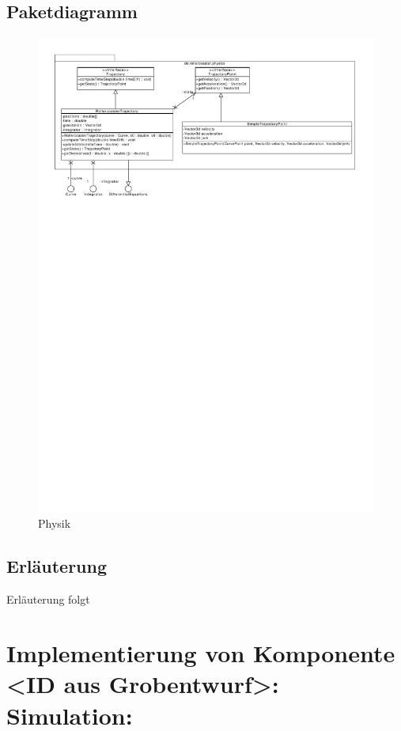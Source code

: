 \subsection{Paketdiagramm}
\begin{figure}
\includegraphics[width=\linewidth]{bilder/Physics}
\caption{Physik}
\end{figure}

\subsection{Erläuterung}

Erläuterung folgt


\section{Implementierung von Komponente
         <ID aus Grobentwurf>: Simulation:}

